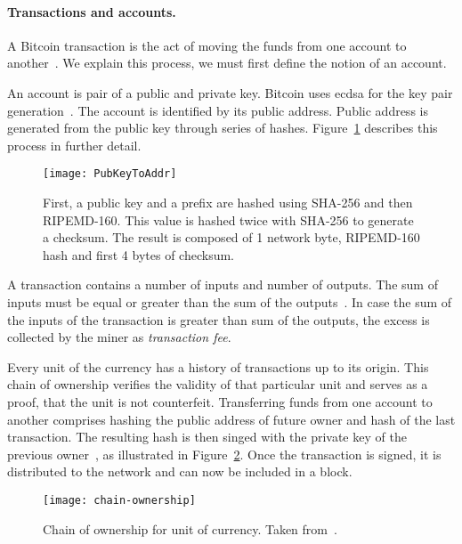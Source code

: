 \paragraph{Transactions and accounts.}
A Bitcoin transaction is the act of moving the funds from one account to another~\cite{Judmayer2017BlocksMechanisms}. We explain this process, we must first define the notion of an account.

An account is pair of a public and private key. Bitcoin uses \acrfull{ecdsa} for the key pair generation~\cite{Decker2013InformationNetwork}. The account is identified by its public address. Public address is generated from the public key through series of hashes. Figure~\ref{fig:public-address-gen} describes this process in further detail.
% 
\begin{figure}[p]
    \centering
    \texttt{[image: PubKeyToAddr]}
    \caption{First, a public key and a prefix are hashed using SHA-256 and then RIPEMD-160. This value is hashed twice with SHA-256 to generate a checksum. The result is composed of 1 network byte, RIPEMD-160 hash and first 4 bytes of checksum.}
    \label{fig:public-address-gen}
\end{figure}

A transaction contains a number of inputs and number of outputs. The sum of inputs must be equal or greater than the sum of the outputs~\cite[p. 27]{Judmayer2017BlocksMechanisms}. In case the sum of the inputs of the transaction is greater than sum of the outputs, the excess is collected by the miner as \textit{transaction fee}.

Every unit of the currency has a history of transactions up to its origin. This chain of ownership verifies the validity of that particular unit and serves as a proof, that the unit is not counterfeit. Transferring funds from one account to another comprises hashing the public address of future owner and hash of the last transaction. The resulting hash is then singed with the private key of the previous owner~\cite{NakamotoBitcoin:System}, as illustrated in Figure~\ref{fig:chain-ownership}. Once the transaction is signed, it is distributed to the network and can now be included in a block.
% 
\begin{figure}[ht]
    \centering
    \texttt{[image: chain-ownership]}
    \caption{Chain of ownership for unit of currency. Taken from~\cite{NakamotoBitcoin:System}.}
    \label{fig:chain-ownership}
\end{figure}

